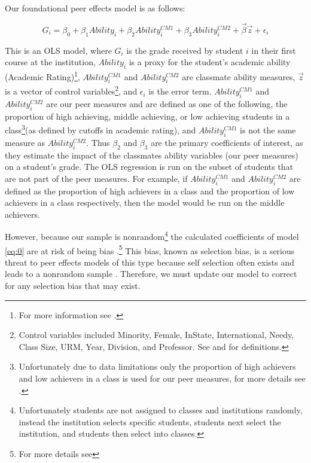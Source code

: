 Our foundational peer effects model is as follows:
\setlength{\belowdisplayskip}{6pt} \setlength{\belowdisplayshortskip}{1pt}
\setlength{\abovedisplayskip}{-4pt} \setlength{\abovedisplayshortskip}{1pt}

\begin{equation}\label{eq:0}
G_{i} = \beta_{0} + \beta_{1} Ability_{i} + \beta_{2} Ability_{i}^{CM1} + \beta_{3} Ability_{i}^{CM2} + \overrightarrow{\beta} \overrightarrow{z} + \epsilon_{i}
\end{equation}

This is an OLS model, where $G_{i}$ is the grade received by student $i$ in their first course at the institution, $Ability_{i}$ is a proxy for the student's academic ability (Academic Rating)\footnote{For more information see .}, $Ability_{i}^{CM1}$ and $Ability_{i}^{CM2}$ are classmate ability measures, $\overrightarrow{z}$ is a vector of control variables\footnote{Control variables included Minority, Female, InState, International, Needy, Class Size, URM, Year, Division, and Professor. See  and  for definitions.}, and $\epsilon_{i}$ is the error term. 
$Ability_{i}^{CM1}$ and $Ability_{i}^{CM2}$ are our peer measures and are defined as one of the following, the proportion of high achieving, middle achieving, or low achieving students in a class\footnote{Unfortunately due to data limitations only the proportion of high achievers and low achievers in a class is used for our peer measures, for more details see .}(as defined by cutoffs in academic rating), and $Ability_{i}^{CM1}$ is not the same measure as  $Ability_{i}^{CM2}$. 
Thus $\beta_{2}$ and $\beta_{3}$ are the primary coefficients of interest, as they estimate the impact of the classmates ability variables (our peer measures) on a student's grade. 
The OLS regression is run on the subset of students that are not part of the peer measures. %
For example, if $Ability_{i}^{CM1}$ and $Ability_{i}^{CM2}$ are defined as the proportion of high achievers in a class and the proportion of low achievers in a class respectively, then the model would be run on the middle achievers. 

However, because our sample is nonrandom\footnote{Unfortunately students are not assigned to classes and institutions randomly, instead the institution selects specific students, students next select the institution, and students then select into classes.} the calculated coefficients of model \eqref{eq:0} are at risk of being bias \citep{heckman1979sample}.\footnote{For more details see } This bias, known as selection bias, is a serious threat to peer effects models of this type because self selection often exists and leads to a nonrandom sample \citep{carman2012classroom,burke2013classroom,ding2007peers}. 
Therefore, we must update our model to correct for any selection bias that may exist.


